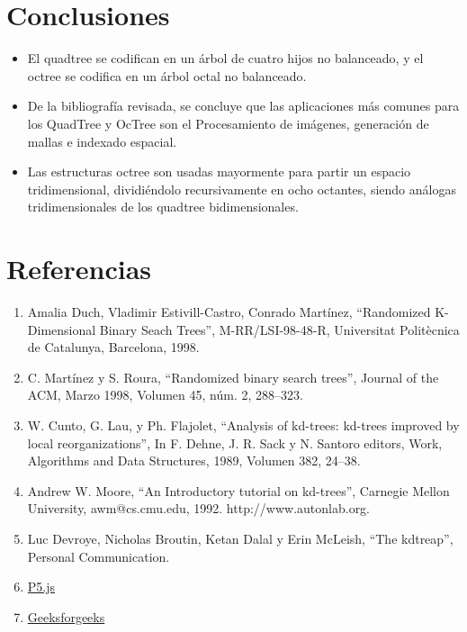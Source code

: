 \documentclass{article}
\begin{document}
\clearpage
\section{Conclusiones}
\begin{itemize}
	\item El quadtree se codifican en un árbol de cuatro hijos no balanceado, y el  octree se codifica en un árbol octal no balanceado.
	\item De la bibliografía revisada, se concluye que las aplicaciones más comunes para los QuadTree y OcTree son el Procesamiento de imágenes, generación de mallas e indexado espacial.
	\item Las estructuras octree son usadas mayormente para partir un espacio tridimensional, dividiéndolo recursivamente en ocho octantes, siendo análogas tridimensionales de los quadtree bidimensionales.
\end{itemize}

\section{Referencias}
\begin{enumerate}
	\item Amalia Duch, Vladimir Estivill-Castro, Conrado Martínez, “Randomized K-Dimensional Binary Seach Trees”, M-RR/LSI-98-48-R, Universitat Politècnica de Catalunya, Barcelona, 1998.
	\item C. Martínez y S. Roura, “Randomized binary search trees”, Journal of the ACM, Marzo 1998, Volumen 45, núm. 2, 288$–$323.
	\item W. Cunto, G. Lau, y Ph. Flajolet, “Analysis of kd-trees: kd-trees improved by local reorganizations”, In F. Dehne, J. R. Sack y N. Santoro editors, Work, Algorithms and Data Structures, 1989, Volumen 382, 24$–$38.
	\item Andrew W. Moore, “An Introductory tutorial on kd-trees”, Carnegie Mellon University, awm@cs.cmu.edu, 1992. http://www.autonlab.org.
	\item Luc Devroye, Nicholas Broutin, Ketan Dalal y Erin McLeish, “The kdtreap”, Personal Communication.
	\item \href{https://p5js.org/es/libraries/}{P5.js}
	\item \href{https://www.geeksforgeeks.org/}{Geeksforgeeks}
\end{enumerate}
\end{document}
